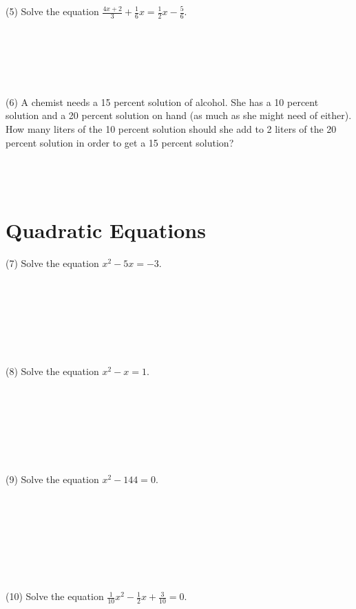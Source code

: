 \documentclass{article}
\begin{document}
(5) Solve the equation $\frac{4x+2}{3} + \frac{1}{6}x = \frac{1}{2}x-\frac{5}{6}$.\\\\\\\\\\\

(6)  A chemist needs a 15 percent solution of alcohol. She has a 10 percent solution and a 20 percent solution on hand (as much as she might need of either). How many liters of the 10 percent solution should she add to 2 liters of the 20 percent solution in order to get a 15 percent solution?\\\\\\\\

\section{Quadratic Equations}


(7) Solve the equation $x^2 -5x  = -3$.\\\\\\\\\\\\\\\\


(8) Solve the equation $x^2 -x = 1$.\\\\\\\\\\\\\\\\





(9) Solve the equation $x^2 - 144 = 0$.\\\\\\\\\\\\\\\



(10) Solve the equation $\frac{1}{10}x^2 -\frac{1}{2}x + \frac{3}{10} = 0$.
\end{document}
